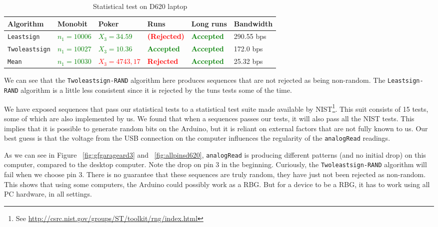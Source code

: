 \documentclass[a4paper]{article}           %
\begin{document}
  \begin{table}[H]
    \begin{center}
      \begin{tabular}{| l | p{1.8cm} | p{2.2cm} | l | l | l |}
        \hline
        Algorithm & Monobit & Poker & Runs & Long runs & Bandwidth\\
        \hline
        \hline
        \texttt{Leastsign} & \textcolor{green}{$n_1 = 10 006$}
        & \textcolor{green}{$X_3 = 34.59$}
        & \textcolor{red}{\textbf{(Rejected)}}
        & \textcolor{green}{\textbf{Accepted}}
        & 290.55 bps \\

        \texttt{Twoleastsign} & \textcolor{green}{$n_1 = 10 027$}
        & \textcolor{green}{$X_3 = 10.36$}
        & \textcolor{green}{\textbf{Accepted}}
        & \textcolor{green}{\textbf{Accepted}}
        & 172.0 bps \\

        \texttt{Mean} & \textcolor{green}{$n_1 = 10030$}
        & \textcolor{red}{$X_3 = 4743,17$}
        & \textcolor{red}{\textbf{Rejected}}
        & \textcolor{green}{\textbf{Accepted}}
        & 25.32 bps \\

        \hline
      \end{tabular}
    \end{center}
    \label{tab:res1}
    \caption{Statistical test on D620 laptop}
  \end{table}

We can see that the \texttt{Twoleastsign-RAND} algorithm here produces sequences that are not rejected as being non-random. The \texttt{Leastsign-RAND} algorithm is a little less consistent since it is rejected by the tuns tests some of the time.

We have exposed sequences that pass our statistical tests to a statistical test suite made available by NIST\footnote{See \url{http://csrc.nist.gov/groups/ST/toolkit/rng/index.html}}. This suit consists of 15 tests, some of which are also implemented by us. We found that when a sequences passes our tests, it will also pass all the NIST tests. This implies that it is possible to generate random bits on the Arduino, but it is reliant on external factors that are not fully known to us. Our best guess is that the voltage from the USB connection on the computer influences the regularity of the \texttt{analogRead} readings. 

 As we can see in Figure ~\ref{fig:gfgarageard3} and ~\ref{fig:allpinsd620}, \texttt{analogRead} is producing different patterns (and no initial drop) on this computer, compared to the desktop computer. Note the drop on pin 3 in the beginning. Curiously, the \texttt{Twoleastsign-RAND} algorithm will fail when we choose pin 3. There is no guarantee that these sequences are truly random, they have just not been rejected as non-random. This shows that using some computers, the Arduino could possibly work as a RBG. But for a device to be a RBG, it has to work using all PC hardware, in all settings. 
\end{document}

